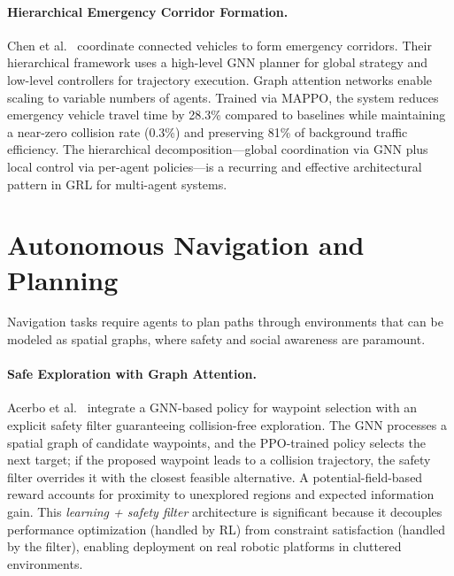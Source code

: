 \documentclass{article}
\begin{document}
\paragraph{Hierarchical Emergency Corridor Formation.}
Chen et al.~\cite{hier_gnn2026} coordinate connected vehicles to form emergency corridors. Their hierarchical framework uses a high-level GNN planner for global strategy and low-level controllers for trajectory execution. Graph attention networks enable scaling to variable numbers of agents. Trained via MAPPO, the system reduces emergency vehicle travel time by 28.3\% compared to baselines while maintaining a near-zero collision rate (0.3\%) and preserving 81\% of background traffic efficiency. The hierarchical decomposition---global coordination via GNN plus local control via per-agent policies---is a recurring and effective architectural pattern in GRL for multi-agent systems.

\section{Autonomous Navigation and Planning}\label{sec:nav}

Navigation tasks require agents to plan paths through environments that can be modeled as spatial graphs, where safety and social awareness are paramount.

\paragraph{Safe Exploration with Graph Attention.}
Acerbo et al.~\cite{safe_explore2025} integrate a GNN-based policy for waypoint selection with an explicit safety filter guaranteeing collision-free exploration. The GNN processes a spatial graph of candidate waypoints, and the PPO-trained policy selects the next target; if the proposed waypoint leads to a collision trajectory, the safety filter overrides it with the closest feasible alternative. A potential-field-based reward accounts for proximity to unexplored regions and expected information gain. This \emph{learning + safety filter} architecture is significant because it decouples performance optimization (handled by RL) from constraint satisfaction (handled by the filter), enabling deployment on real robotic platforms in cluttered environments.
\end{document}
